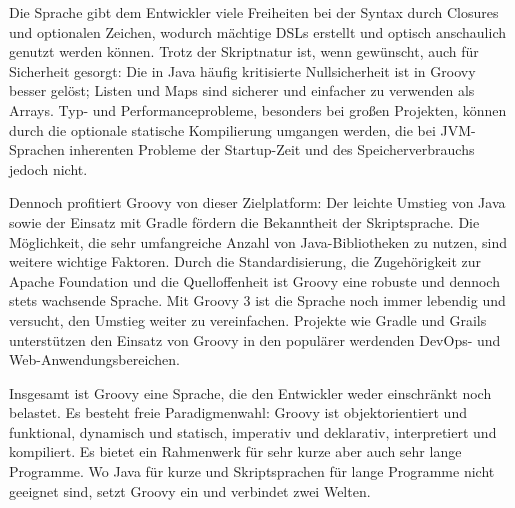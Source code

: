 \documentclass[a4paper]{article}
\begin{document}
Die Sprache gibt dem Entwickler viele Freiheiten bei der Syntax durch Closures und optionalen Zeichen, wodurch mächtige DSLs erstellt und optisch anschaulich genutzt werden können.
Trotz der Skriptnatur ist, wenn gewünscht, auch für Sicherheit gesorgt:
Die in Java häufig kritisierte Nullsicherheit ist in Groovy besser gelöst;
Listen und Maps sind sicherer und einfacher zu verwenden als Arrays.
Typ- und Performanceprobleme, besonders bei großen Projekten, können durch die optionale statische Kompilierung umgangen werden,
die bei JVM-Sprachen inherenten Probleme der Startup-Zeit und des Speicherverbrauchs jedoch nicht.

Dennoch profitiert Groovy von dieser Zielplatform:
Der leichte Umstieg von Java sowie der Einsatz mit Gradle fördern die Bekanntheit der Skriptsprache.
Die Möglichkeit, die sehr umfangreiche Anzahl von Java-Bibliotheken zu nutzen, sind weitere wichtige Faktoren.
Durch die Standardisierung, die Zugehörigkeit zur Apache Foundation und die Quelloffenheit ist Groovy eine robuste und dennoch stets wachsende Sprache.
Mit Groovy 3 ist die Sprache noch immer lebendig und versucht, den Umstieg weiter zu vereinfachen.
Projekte wie Gradle und Grails unterstützen den Einsatz von Groovy in den populärer werdenden DevOps- und Web-Anwendungsbereichen.

Insgesamt ist Groovy eine Sprache, die den Entwickler weder einschränkt noch belastet.
Es besteht freie Paradigmenwahl:
Groovy ist objektorientiert und funktional, dynamisch und statisch, imperativ und deklarativ, interpretiert und kompiliert.
Es bietet ein Rahmenwerk für sehr kurze aber auch sehr lange Programme.
Wo Java für kurze und Skriptsprachen für lange Programme nicht geeignet sind, setzt Groovy ein und verbindet zwei Welten.



\begingroup
	\linespread{0}\selectfont %
	
\endgroup

\end{document}
